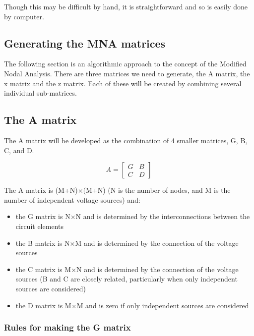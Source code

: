 Though this may be difficult by hand, it is straightforward and so is
easily done by computer.

\subsection{Generating the MNA matrices}

The following section is an algorithmic approach to the concept of the
Modified Nodal Analysis.  There are three matrices we need to
generate, the A matrix, the x matrix and the z matrix.  Each of these
will be created by combining several individual sub-matrices.

\subsection{The A matrix}

The A matrix will be developed as the combination of 4 smaller
matrices, G, B, C, and D.

\begin{equation}
A =
\begin{bmatrix}
G & B\\
C & D
\end{bmatrix}
\end{equation}

The A matrix is (M+N)$\times$(M+N) (N is the number of nodes, and M is the
number of independent voltage sources) and:

\begin{itemize}
\item
the G matrix is N$\times$N and is determined by the interconnections
between the circuit elements
\item
the B matrix is N$\times$M and is determined by the connection of the voltage
sources
\item
the C matrix is M$\times$N and is determined by the connection of
the voltage sources (B and C are closely related, particularly when
only independent sources are considered)
\item
the D matrix is M$\times$M and is zero if only independent sources are
considered
\end{itemize}

\subsubsection{Rules for making the G matrix}


